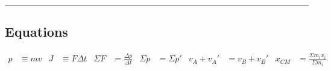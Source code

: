 \documentclass[10pt]{exam}
\begin{document}
\hrule 

\subsection*{Equations}

\begin{align*}
  p &\equiv mv &
  J &\equiv F\Delta t &
  \Sigma F &= \frac{\Delta p}{\Delta t} &
  \Sigma p &= \Sigma p ' &
  v_A + v_A' &= v_B + v_B' &
  x_{CM} &= \frac{\Sigma m_i x_i}{\Sigma m_i}
\end{align*}
\end{document}
